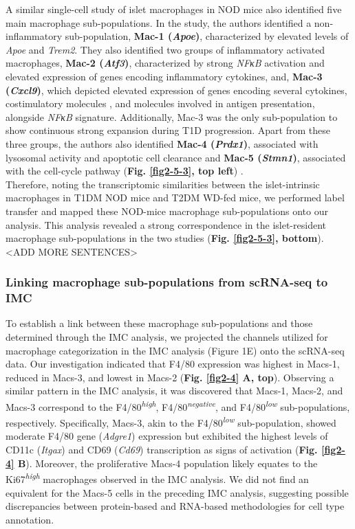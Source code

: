 A similar single-cell study of islet macrophages in NOD mice also identified five main macrophage sub-populations. In the study, the authors identified a non-inflammatory sub-population, \textbf{Mac-1 (\textit{Apoe})}, characterized by elevated levels of \textit{Apoe} and \textit{Trem2}. They also identified two groups of inflammatory activated macrophages, \textbf{Mac-2 (\textit{Atf3})}, characterized by strong \textit{NFκB} activation and elevated expression of genes encoding inflammatory cytokines, and, \textbf{Mac-3 (\textit{Cxcl9})}, which depicted elevated expression of genes encoding several cytokines, costimulatory molecules , and molecules involved in antigen presentation, alongside \textit{NFκB} signature. Additionally, Mac-3 was the only sub-population to show continuous strong expansion during T1D progression. Apart from these three groups, the authors also identified \textbf{Mac-4 (\textit{Prdx1})}, associated with lysosomal activity and apoptotic cell clearance and \textbf{Mac-5 (\textit{Stmn1})}, associated with the cell-cycle pathway (\textbf{Fig. \ref{fig2-5-3}, top left}) \textbf{\cite{zakharov_single-cell_2020}}.  \\

Therefore, noting the transcriptomic similarities between the islet-intrinsic macrophages in T1DM NOD mice and T2DM WD-fed mice, we performed label transfer and mapped these NOD-mice macrophage sub-populations onto our analysis. This analysis revealed a strong correspondence in the islet-resident macrophage sub-populations in the two studies (\textbf{Fig. \ref{fig2-5-3}, bottom}). <ADD MORE SENTENCES>



\subsubsection{Linking macrophage sub-populations from scRNA-seq to IMC}
To establish a link between these macrophage sub-populations and those determined through the IMC analysis, we projected the channels utilized for macrophage categorization in the IMC analysis (Figure 1E) onto the scRNA-seq data. Our investigation indicated that F4/80 expression was highest in Macs-1, reduced in Macs-3, and lowest in Macs-2 (\textbf{Fig. \ref{fig2-4} A, top}). Observing a similar pattern in the IMC analysis, it was discovered that Macs-1, Macs-2, and Macs-3 correspond to the F4/80\textsuperscript{\textit{high}}, F4/80\textsuperscript{\textit{negative}}, and F4/80\textsuperscript{\textit{low}} sub-populations, respectively. Specifically, Macs-3, akin to the F4/80\textsuperscript{\textit{low}} sub-population, showed moderate F4/80 gene (\textit{Adgre1}) expression but exhibited the highest levels of CD11c (\textit{Itgax}) and CD69 (\textit{Cd69}) transcription as signs of activation (\textbf{Fig. \ref{fig2-4} B}). Moreover, the proliferative Macs-4 population likely equates to the Ki67\textsuperscript{\textit{high}} macrophages observed in the IMC analysis. We did not find an equivalent for the Macs-5 cells in the preceding IMC analysis, suggesting possible discrepancies between protein-based and RNA-based methodologies for cell type annotation. 

